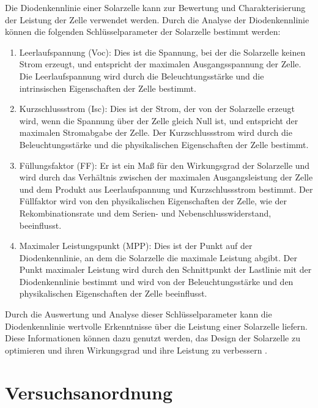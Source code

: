 \documentclass[12pt,english,ngerman]{scrartcl}
\begin{document}
Die Diodenkennlinie einer Solarzelle kann zur Bewertung und Charakterisierung
der Leistung der Zelle verwendet werden. Durch die Analyse der Diodenkennlinie
können die folgenden Schlüsselparameter der Solarzelle bestimmt werden:

\begin{enumerate}
	\item Leerlaufspannung (Voc): Dies ist die Spannung, bei der die Solarzelle keinen
	      Strom erzeugt, und entspricht der maximalen Ausgangsspannung der Zelle. Die
	      Leerlaufspannung wird durch die Beleuchtungsstärke und die intrinsischen
	      Eigenschaften der Zelle bestimmt.
	\item Kurzschlussstrom (Isc): Dies ist der Strom, der von der Solarzelle erzeugt
	      wird, wenn die Spannung über der Zelle gleich Null ist, und entspricht der
	      maximalen Stromabgabe der Zelle. Der Kurzschlussstrom wird durch die
	      Beleuchtungsstärke und die physikalischen Eigenschaften der Zelle bestimmt.
	\item Füllungsfaktor (FF): Er ist ein Maß für den Wirkungsgrad der Solarzelle und
	      wird durch das Verhältnis zwischen der maximalen Ausgangsleistung der Zelle und
	      dem Produkt aus Leerlaufspannung und Kurzschlussstrom bestimmt. Der Füllfaktor
	      wird von den physikalischen Eigenschaften der Zelle, wie der Rekombinationsrate
	      und dem Serien- und Nebenschlusswiderstand, beeinflusst.
	\item Maximaler Leistungspunkt (MPP): Dies ist der Punkt auf der Diodenkennlinie, an
	      dem die Solarzelle die maximale Leistung abgibt. Der Punkt maximaler Leistung
	      wird durch den Schnittpunkt der Lastlinie mit der Diodenkennlinie bestimmt und
	      wird von der Beleuchtungsstärke und den physikalischen Eigenschaften der Zelle
	      beeinflusst.
\end{enumerate}

Durch die Auswertung und Analyse dieser Schlüsselparameter kann die
Diodenkennlinie wertvolle Erkenntnisse über die Leistung einer Solarzelle
liefern. Diese Informationen können dazu genutzt werden, das Design der
Solarzelle zu optimieren und ihren Wirkungsgrad und ihre Leistung zu
verbessern \cite{unterlagen_solarzelle}.



\section{Versuchsanordnung}\label{sec:versuchsanordnung}
\end{document}
